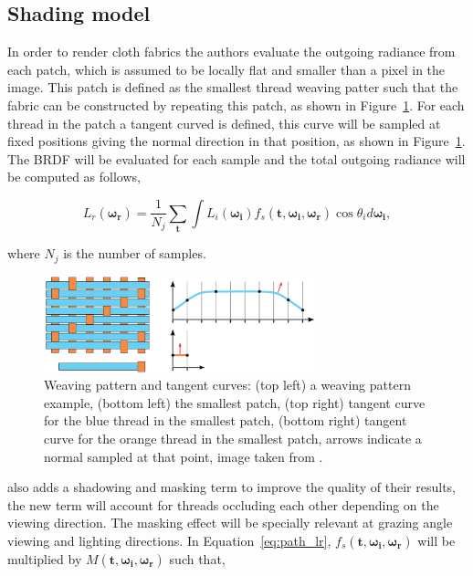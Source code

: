 \documentclass[12pt]{article}
\newcommand{\omegai}{\boldsymbol{\omega_i}}
\newcommand{\omegar}{\boldsymbol{\omega_r}}
\newcommand{\tb}{\mathbf{t}}
\begin{document}
\subsection{Shading model}
\label{sec:shading_model}

In order to render cloth fabrics the authors evaluate the outgoing radiance from each patch, which is assumed to be locally flat and smaller than a pixel in the image.
This patch is defined as the smallest thread weaving patter such that the fabric can be constructed by repeating this patch, as shown in Figure~\ref{fig:tanget_curve}.
For each thread in the patch a tangent curved is defined, this curve will be sampled at fixed positions giving the normal direction in that position, as shown in Figure~\ref{fig:tanget_curve}.
The BRDF will be evaluated for each sample and the total outgoing radiance will be computed as follows,

\begin{equation}
L_{r}(\omegar) = \frac{1}{N_j} \sum_\tb \int L_i(\omegai) f_s(\tb, \omegai, \omegar) \cos \theta_i d \omegai,
\label{eq:path_lr}
\end{equation}

where $N_j$ is the number of samples.

\begin{figure}[htbp!]
\centering
\includegraphics[width=0.7\textwidth]{images/tanget_curve}
	\caption{Weaving pattern and tangent curves: (top left) a weaving pattern example, (bottom left) the smallest patch, (top right) tangent curve for the blue thread in the smallest patch, (bottom right) tangent curve for the orange thread in the smallest patch, arrows indicate a normal sampled at that point, image taken from \cite{Sadeghi2013}.}
	\label{fig:tanget_curve}
\end{figure}

\citeauthor{Sadeghi2013} also adds a shadowing and masking term to improve the quality of their results, the new term will account for threads occluding each other depending on the viewing direction.
The masking effect will be specially relevant at grazing angle viewing and lighting directions.
In Equation~\ref{eq:path_lr}, $f_s(\tb, \omegai, \omegar)$ will be multiplied by $M(\tb, \omegai, \omegar)$ such that,
\end{document}
